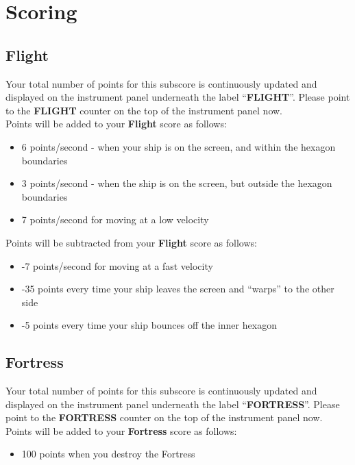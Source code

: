 \documentclass[letterpaper,12pt]{article}
\begin{document}
\section{Scoring}

\subsection{Flight}

Your total number of points for this subscore is continuously updated and displayed on
the instrument panel underneath the label ``\textbf{FLIGHT}''. Please point to the \textbf{FLIGHT}
counter on the top of the instrument panel now.\\

\noindent
Points will be added to your \textbf{Flight} score as follows:
\begin{itemize}
\item 6 points/second - when your ship is on the screen, and within the hexagon
boundaries
\item 3 points/second - when the ship is on the screen, but outside the hexagon
boundaries
\item 7 points/second for moving at a low velocity
\end{itemize}

\noindent
Points will be subtracted from your \textbf{Flight} score as follows:
\begin{itemize}
\item -7 points/second for moving at a fast velocity
\item -35 points every time your ship leaves the screen and ``warps'' to the other side
\item -5 points every time your ship bounces off the inner hexagon
\end{itemize}

\subsection{Fortress}

Your total number of points for this subscore is continuously updated and displayed on
the instrument panel underneath the label ``\textbf{FORTRESS}''. Please point to the
\textbf{FORTRESS} counter on the top of the instrument panel now.\\

\noindent
Points will be added to your \textbf{Fortress} score as follows:
\begin{itemize}
\item 100 points when you destroy the Fortress
\end{itemize}
\end{document}
